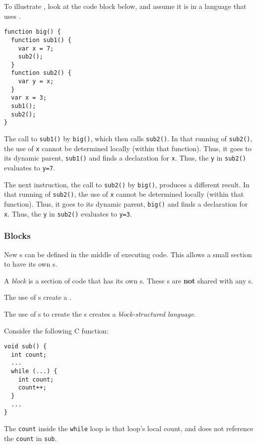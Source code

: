 To illustrate , look at the code block below, and assume it is in a language that uses .
\begin{verbatim}
function big() {
  function sub1() {
    var x = 7;
    sub2();
  }
  function sub2() {
    var y = x;
  }
  var x = 3;
  sub1();
  sub2();
}
\end{verbatim}

The call to \texttt{sub1()} by \texttt{big()}, which then calls \texttt{sub2()}.
In that running of \texttt{sub2()}, the use of \texttt{x} cannot be determined locally (within that function).
Thus, it goes to its dynamic parent, \texttt{sub1()} and finds a declaration for \texttt{x}.
Thus, the \texttt{y} in \texttt{sub2()} evaluates to \texttt{y=7}.

The next instruction, the call to \texttt{sub2()} by \texttt{big()}, produces a different result.
In that running of \texttt{sub2()}, the use of \texttt{x} cannot be determined locally (within that function).
Thus, it goes to its dynamic parent, \texttt{big()} and finds a declaration for \texttt{x}.
Thus, the \texttt{y} in \texttt{sub2()} evaluates to \texttt{y=3}.

\subsubsection{Blocks}\label{subsubsec:Variable_Blocks}
New s can be defined in the middle of executing code.
This allows a small section to have its own s.

\begin{definition}[Block]\label{def:Block_Scope}
  A \emph{block} is a section of code that has its own s.
  These s are \textbf{not} shared with any s.
\end{definition}

The use of s create a .

\begin{definition}\label{def:Block_Structured_Language}
  The use of s to create the s creates a \emph{block-structured language}.
\end{definition}

Consider the following C function:
\begin{verbatim}
void sub() {
  int count;
  ...
  while (...) {
    int count;
    count++;
  }
  ...
}
\end{verbatim}
The \texttt{count} inside the \texttt{while} loop is that loop's local count, and does not reference the \texttt{count} in \texttt{sub}.

